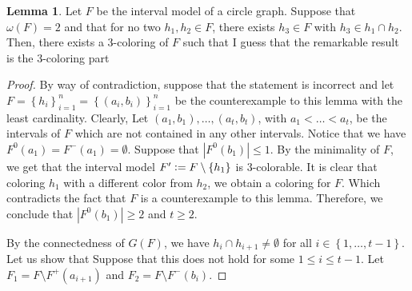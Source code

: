 \documentclass[12pt]{article}
\theoremstyle{definition}
\newtheorem{lemma}[thm]{Lemma}
\newcommand{\defeq}{\vcentcolon=}
\begin{document}
    \begin{lemma} \label{lemma:4.4}
        Let $F$ be the interval
        model of a circle graph.
        Suppose that $\omega\left(F\right) = 2$ 
        and that for no two
        $h_1, h_2 \in F$,
        there exists $h_3 \in F$ 
        with $h_3 \in h_1 \cap h_2$.
        Then, there exists a 3-coloring
        of $F$ such that 
        {I guess that the remarkable
        result is the 3-coloring
        part}
    \end{lemma}
    \begin{proof}
        By way of contradiction,
        suppose that the statement is incorrect
        and let $F = \left\{h_{i}\right\}_{i = 1}^{n} =
        \left\{\left(a_{i}, b_{i}\right)\right\}_{i = 1}^{n}$
        be the counterexample
        to this lemma with the
        least cardinality.
        Clearly, 
        Let $\left(a_1, b_1\right),
        \ldots, \left(a_{t}, b_{t}\right)$,
        with $a_1 < \ldots < a_{t}$,
        be the intervals of $F$ which
        are not contained in any other 
        intervals. Notice that we have
        $F^{0}\left(a_{1}\right) = 
        F^{-}\left(a_1\right) = \emptyset$.
        Suppose that $\left|F^{0}\left(b_1\right)\right| \leq 1$.
        By the minimality of $F$,
        we get that the interval
        model $F' \defeq F \setminus \left\{h_{1}\right\}$ 
        is 3-colorable. It is clear
        that coloring $h_1$ with a different
        color from $h_2$, we obtain a coloring
        for $F$. Which contradicts the fact
        that $F$ is a counterexample to this lemma.
        Therefore, we conclude that $\left|F^{0}\left(b_1\right)\right| \geq 2$ 
        and $t \geq 2$.

        By the connectedness of $G\left(F\right)$,
        we have $h_{i} \cap h_{i+1} \neq \emptyset$ 
        for all $i \in \left\{1, \ldots, t -1\right\}$.
        Let us show that 
        Suppose that this does not
        hold for some $1 \leq i \leq t - 1$.
        Let $F_1 = F \setminus F^{+}\left(a_{i+1}\right)$
        and $F_2 = F \setminus F^{-}\left(b_{i}\right)$.
        

\end{proof}
\end{document}
